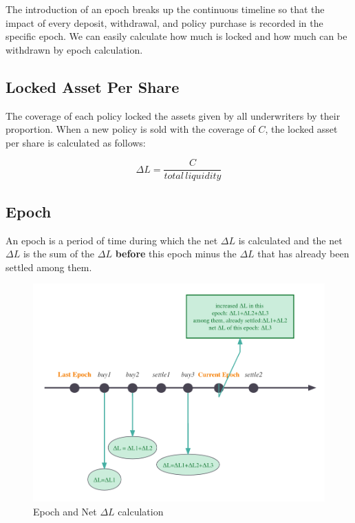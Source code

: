 The introduction of an epoch breaks up the continuous timeline so that the impact of every deposit, withdrawal, and policy purchase is recorded in the specific epoch.
We can easily calculate how much is locked and how much can be withdrawn by epoch calculation.

\subsection{Locked Asset Per Share}\label{subsec:locked-asset-per-share}

The coverage of each policy locked the assets given by all underwriters by their proportion.
When a new policy is sold with the coverage of $C$, the locked asset per share is calculated as follows:

\begin{equation}
	\Delta L = \frac{C}{total\,liquidity}\label{eq:equation2}
\end{equation}

\subsection{Epoch}\label{subsec:epoch}

An epoch is a period of time during which the net $\Delta L$ is calculated and the net $\Delta L$ is the sum of the $\Delta L$ \textbf{before} this epoch minus the $\Delta L$ that has already been settled among them.

\begin{figure}[H]
	\includegraphics[width=0.8\linewidth]{./graphs/net_delta_impact}
	\centering
	\caption{Epoch and Net $\Delta L$ calculation} %
	\label{fig:epoch-and-net-delta-l} %
\end{figure}

